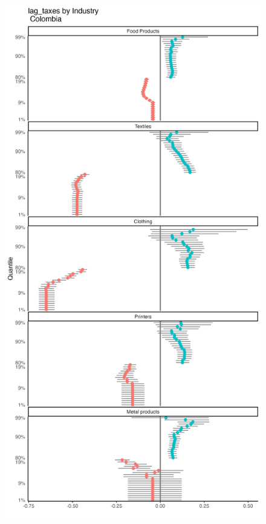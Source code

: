 \documentclass[
  12pt]{article}
\theoremstyle{definition}
\theoremstyle{remark}
\begin{document}
\begin{figure}

{\centering \includegraphics[width=\textwidth,height=1\textheight]{../Results/Figures/Colombia/lag_taxes_by_inds_diff.png}

}

\end{figure}
\end{document}
